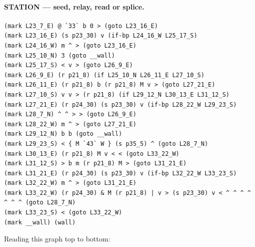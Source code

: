 \documentclass[11pt,a4paper]{article}
\begin{document}
\paragraph{STATION --- seed, relay, read or splice.}
{\footnotesize
\begin{verbatim}
(mark L23_7_E) @ `33` b 0 > (goto L23_16_E)
(mark L23_16_E) (s p23_30) v (if-bp L24_16_W L25_17_S)
(mark L24_16_W) m ^ > (goto L23_16_E)
(mark L25_10_N) 3 (goto __wall)
(mark L25_17_S) < v > (goto L26_9_E)
(mark L26_9_E) (r p21_8) (if L25_10_N L26_11_E L27_10_S)
(mark L26_11_E) (r p21_8) b (r p21_8) M v > (goto L27_21_E)
(mark L27_10_S) v v > (r p21_8) (if L29_12_N L30_13_E L31_12_S)
(mark L27_21_E) (r p24_30) (s p23_30) v (if-bp L28_22_W L29_23_S)
(mark L28_7_N) ^ ^ > > (goto L26_9_E)
(mark L28_22_W) m ^ > (goto L27_21_E)
(mark L29_12_N) b b (goto __wall)
(mark L29_23_S) < { M `43` W } (s p35_5) ^ (goto L28_7_N)
(mark L30_13_E) (r p21_8) M v < < (goto L33_22_W)
(mark L31_12_S) > b m (r p21_8) M > (goto L31_21_E)
(mark L31_21_E) (r p24_30) (s p23_30) v (if-bp L32_22_W L33_23_S)
(mark L32_22_W) m ^ > (goto L31_21_E)
(mark L33_22_W) (r p24_30) & M (r p21_8) | v > (s p23_30) v < ^ ^ ^ ^ ^ ^ ^ (goto L28_7_N)
(mark L33_23_S) < (goto L33_22_W)
(mark __wall) (wall)
\end{verbatim}
}
Reading this graph top to bottom:
\end{document}
